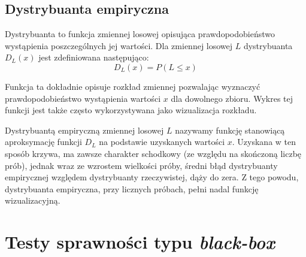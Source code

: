 \documentclass[12pt,a4paper]{report}
\begin{document}
{{{{{\subsection{Dystrybuanta empiryczna}
\par{
Dystrybuanta to funkcja zmiennej losowej opisująca prawdopodobieństwo wystąpienia poszczególnych jej wartości. Dla zmiennej losowej $L$ dystrybuanta $D_L(x)$ jest zdefiniowana następująco:
\begin{equation}
D_L(x) = P(L \le x)
\end{equation}
}
\par{
Funkcja ta dokładnie opisuje rozkład zmiennej pozwalając wyznaczyć prawdopodobieństwo wystąpienia wartości $x$ dla dowolnego zbioru. Wykres tej funkcji jest także często wykorzystywana jako wizualizacja rozkładu.
}
\par{
Dystrybuantą empiryczną zmiennej losowej $L$ nazywamy funkcję stanowiącą aproksymację funkcji $D_L$ na podstawie uzyskanych wartości $x$. Uzyskana w ten sposób krzywa, ma zawsze charakter schodkowy (ze względu na skończoną liczbę prób), jednak wraz ze wzrostem wielkości próby, średni błąd dystrybuanty empirycznej względem dystrybuanty rzeczywistej, dąży do zera. Z tego powodu, dystrybuanta empiryczna, przy licznych próbach, pełni nadal funkcję wizualizacyjną.
}

\section{Testy sprawności typu \emph{black-box}}
\label{benchmarkChapter}
}}}}}
\end{document}
